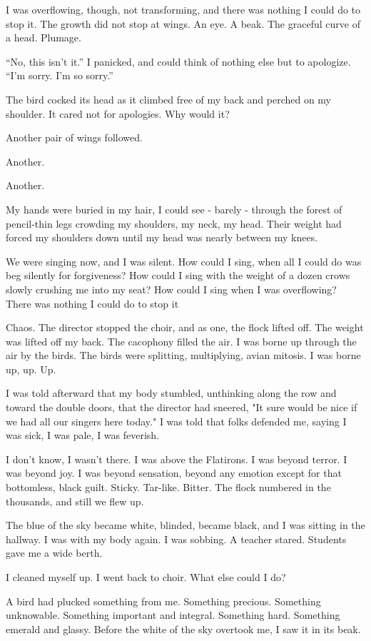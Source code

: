 \begin{paracol}{2}
\begin{leftcolumn}
I was overflowing, though, not transforming, and there was nothing I could do to stop it. The growth did not stop at wings. An eye. A beak. The graceful curve of a head. Plumage.

``No, this isn't it.'' I panicked, and could think of nothing else but to apologize. ``I'm sorry. I'm so sorry.''

The bird cocked its head as it climbed free of my back and perched on my shoulder. It cared not for apologies. Why would it?

Another pair of wings followed.

Another.

Another.

My hands were buried in my hair, I could see - barely - through the forest of pencil-thin legs crowding my shoulders, my neck, my head. Their weight had forced my shoulders down until my head was nearly between my knees.

We were singing now, and I was silent. How could I sing, when all I could do was beg silently for forgiveness? How could I sing with the weight of a dozen crows slowly crushing me into my seat? How could I sing when I was overflowing? There was nothing I could do to stop it

Chaos. The director stopped the choir, and as one, the flock lifted off. The weight was lifted off my back. The cacophony filled the air. I was borne up through the air by the birds. The birds were splitting, multiplying, avian mitosis. I was borne up, up. Up.

I was told afterward that my body stumbled, unthinking along the row and toward the double doors, that the director had sneered, "It sure would be nice if we had all our singers here today." I was told that folks defended me, saying I was sick, I was pale, I was feverish.

I don't know, I wasn't there. I was above the Flatirons. I was beyond terror. I was beyond joy. I was beyond sensation, beyond any emotion except for that bottomless, black guilt. Sticky. Tar-like. Bitter. The flock numbered in the thousands, and still we flew up.

The blue of the sky became white, blinded, became black, and I was sitting in the hallway. I was with my body again. I was sobbing. A teacher stared. Students gave me a wide berth.

I cleaned myself up. I went back to choir. What else could I do?

A bird had plucked something from me. Something precious. Something unknowable. Something important and integral. Something hard. Something emerald and glassy. Before the white of the sky overtook me, I saw it in its beak.


\end{leftcolumn}
\end{paracol}
